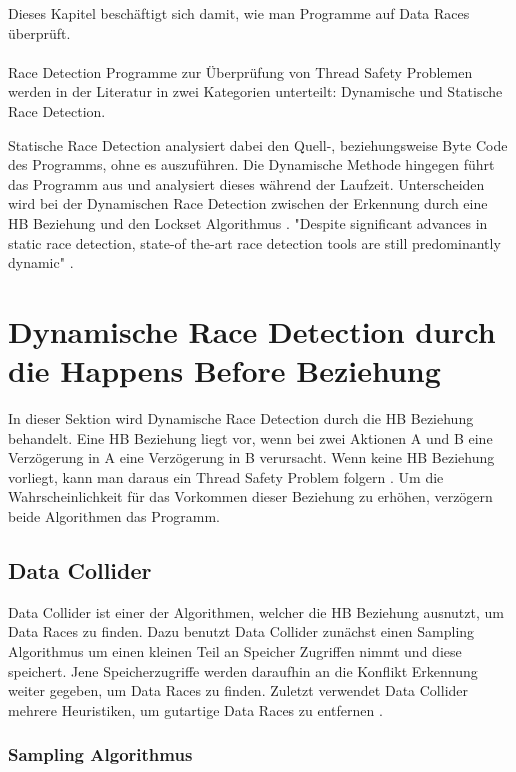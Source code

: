 Dieses Kapitel beschäftigt sich damit, wie man Programme auf Data Races überprüft.\\
\\
Race Detection Programme zur Überprüfung von Thread Safety Problemen werden in der Literatur in zwei Kategorien unterteilt: Dynamische und Statische Race Detection. 

Statische Race Detection analysiert dabei den Quell-, beziehungsweise Byte Code des Programms, ohne es auszuführen. Die Dynamische Methode hingegen führt das Programm aus und analysiert dieses während der Laufzeit. Unterscheiden wird bei der Dynamischen Race Detection zwischen der Erkennung durch eine \acs{HB} Beziehung und den Lockset Algorithmus \cite[vgl.][4]{erickson_effective_nodate}. "Despite significant advances in static race detection, state-of the-art race detection tools are still predominantly dynamic" \cite[308]{naik_effective_nodate}.

\section{Dynamische Race Detection durch die Happens Before Beziehung}

In dieser Sektion wird Dynamische Race Detection durch die \acs{HB} Beziehung behandelt. Eine \acs{HB} Beziehung liegt vor, wenn bei zwei Aktionen A und B eine Verzögerung in A eine Verzögerung in B verursacht. Wenn keine \acs{HB} Beziehung vorliegt, kann man daraus ein Thread Safety Problem folgern \cite[vgl.][163]{li_efficient_2019}. Um die Wahrscheinlichkeit für das Vorkommen dieser Beziehung zu erhöhen, verzögern beide Algorithmen das Programm.  

\subsection{Data Collider}

Data Collider ist einer der Algorithmen, welcher die \acs{HB} Beziehung ausnutzt, um Data Races zu finden. Dazu benutzt Data Collider zunächst einen Sampling Algorithmus um einen kleinen Teil an Speicher Zugriffen nimmt und diese speichert. Jene Speicherzugriffe werden daraufhin an die Konflikt Erkennung weiter gegeben, um Data Races zu finden. Zuletzt verwendet Data Collider mehrere Heuristiken, um gutartige Data Races zu entfernen \cite[vgl.][6]{erickson_effective_nodate}.  

\subsubsection*{Sampling Algorithmus}

